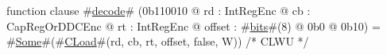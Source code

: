 function clause #\hyperref[zdecode]{decode}# (0b110010 @ rd : IntRegEnc @ cb : CapRegOrDDCEnc @ rt : IntRegEnc @ offset : #\hyperref[zbits]{bits}#(8) @ 0b0 @ 0b10) = #\hyperref[zSome]{Some}#(#\hyperref[zCLoad]{CLoad}#(rd, cb, rt, offset, false, W)) /* CLWU */
